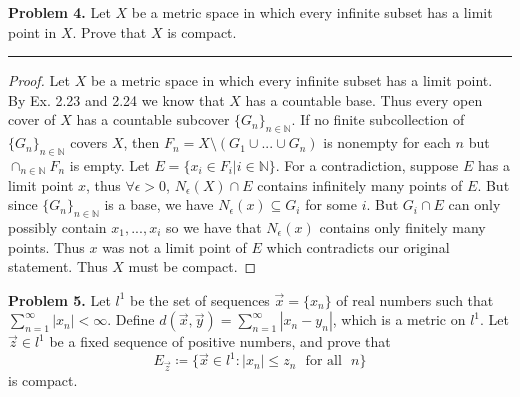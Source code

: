 \documentclass[leqno]{article}
\theoremstyle{nonumberplain}
\newtheorem{proof}{Proof}
\begin{document}
\pagebreak





\noindent\textbf{Problem 4.} Let $X$ be a metric space in which every infinite subset has a limit point in $X$. Prove that $X$ is compact.

\noindent\rule[0.5ex]{\linewidth}{1pt}

\begin{proof} 
Let $X$ be a metric space in which every infinite subset has a limit point. By Ex. 2.23 and 2.24 we know that $X$ has a countable base. Thus every open cover of $X$ has a countable subcover $\{G_n\}_{n\in \mathbb{N}}$. If no finite subcollection of $\{G_n\}_{n\in \mathbb{N}}$ covers $X$, then $F_n = X\setminus (G_1\cup ... \cup G_n)$ is nonempty for each $n$ but $\cap_{n\in \mathbb{N}}F_n$ is empty. Let $E=\{x_i\in F_i \vert i \in \mathbb{N}\}$. For a contradiction, suppose $E$ has a limit point $x$, thus $\forall \epsilon >0$, $N_\epsilon(X)\cap E$ contains infinitely many points of $E$. But since $\{G_n\}_{n\in \mathbb{N}}$ is a base, we have $N_\epsilon (x)\subseteq G_i$ for some $i$. But $G_i\cap E$ can only possibly contain $x_1,..., x_i$ so we have that $N_\epsilon(x)$ contains only finitely many points.  Thus $x$ was not a limit point of $E$ which contradicts our original statement.  Thus $X$ must be compact.
\end{proof}

\pagebreak




\noindent\textbf{Problem 5.} Let $l^1$ be the set of sequences $\vec{x}=\{x_n\}$ of real numbers such that $\sum_{n=1}^\infty |x_n|<\infty$. Define $d(\vec{x},\vec{y})=\sum_{n=1}^\infty |x_n-y_n|$, which is a metric on $l^1$. Let $\vec{z}\in l^1$ be a fixed sequence of positive numbers, and prove that
\[
E_{\vec{z}}\coloneqq \{\vec{x}\in l^1 \colon |x_n|\leq z_n \textrm{~ for all ~} n\}
\]
is compact.
\end{document}
